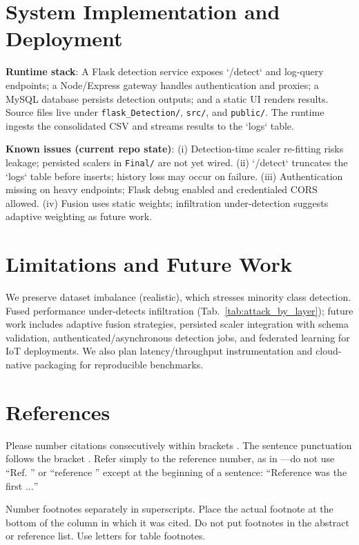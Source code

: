 \documentclass[conference]{IEEEtran}
\begin{document}
\section{System Implementation and Deployment}
\textbf{Runtime stack}: A Flask detection service exposes `/detect` and log-query endpoints; a Node/Express gateway handles authentication and proxies; a MySQL database persists detection outputs; and a static UI renders results. Source files live under \texttt{flask\_Detection/}, \texttt{src/}, and \texttt{public/}. The runtime ingests the consolidated CSV and streams results to the `logs` table.

\textbf{Known issues (current repo state)}: (i) Detection-time scaler re-fitting risks leakage; persisted scalers in \texttt{Final/} are not yet wired. (ii) `/detect` truncates the `logs` table before inserts; history loss may occur on failure. (iii) Authentication missing on heavy endpoints; Flask debug enabled and credentialed CORS allowed. (iv) Fusion uses static weights; infiltration under-detection suggests adaptive weighting as future work.

\section{Limitations and Future Work}
We preserve dataset imbalance (realistic), which stresses minority class detection. Fused performance under-detects infiltration (Tab.~\ref{tab:attack_by_layer}); future work includes adaptive fusion strategies, persisted scaler integration with schema validation, authenticated/asynchronous detection jobs, and federated learning for IoT deployments. We also plan latency/throughput instrumentation and cloud-native packaging for reproducible benchmarks.

\section*{References}

Please number citations consecutively within brackets \cite{b1}. The 
sentence punctuation follows the bracket \cite{b2}. Refer simply to the reference 
number, as in \cite{b3}---do not use ``Ref. \cite{b3}'' or ``reference \cite{b3}'' except at 
the beginning of a sentence: ``Reference \cite{b3} was the first $\ldots$''

Number footnotes separately in superscripts. Place the actual footnote at 
the bottom of the column in which it was cited. Do not put footnotes in the 
abstract or reference list. Use letters for table footnotes.
\end{document}

